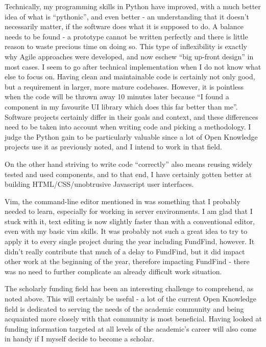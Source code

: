 Technically, my programming skills in Python have improved, with a much better idea of what is ``pythonic'', and even better - an understanding that it doesn't necessarily matter, if the software does what it is supposed to do. A balance needs to be found - a prototype cannot be written perfectly and there is little reason to waste precious time on doing so. This type of inflexibility is exactly why Agile approaches were developed, and now eschew ``big up-front design'' in most cases. I seem to go after technical implementation when I do not know what else to focus on. Having clean and maintainable code is certainly not only good, but a requirement in larger, more mature codebases. However, it is pointless when the code will be thrown away 10 minutes later because ``I found a component in my favourite UI library which does this far better than me''. Software projects certainly differ in their goals and context, and these differences need to be taken into account when writing code and picking a methodology. I 
judge the Python gain to be particularly valuable since a lot of Open Knowledge projects use it as previously noted, and I intend to work in that field.

On the other hand striving to write code ``correctly'' also means reusing widely tested and used components, and to that end, I have certainly gotten better at building HTML/CSS/unobtrusive Javascript user interfaces.

Vim, the command-line editor mentioned in  was something that I probably needed to learn, especially for working in server environments. I am glad that I stuck with it, text editing is now slightly faster than with a conventional editor, even with my basic vim skills. It was probably not such a great idea to try to apply it to every single project during the year including FundFind, however. It didn't really contribute that much of a delay to FundFind, but it did impact other work at the beginning of the year, therefore impacting FundFind - there was no need to further complicate an already difficult work situation.

The scholarly funding field has been an interesting challenge to comprehend, as noted above. This will certainly be useful - a lot of the current Open Knowledge field is dedicated to serving the needs of the academic community and being acquainted more closely with that community is most beneficial. Having looked at funding information targeted at all levels of the academic's career will also come in handy if I myself decide to become a scholar.

